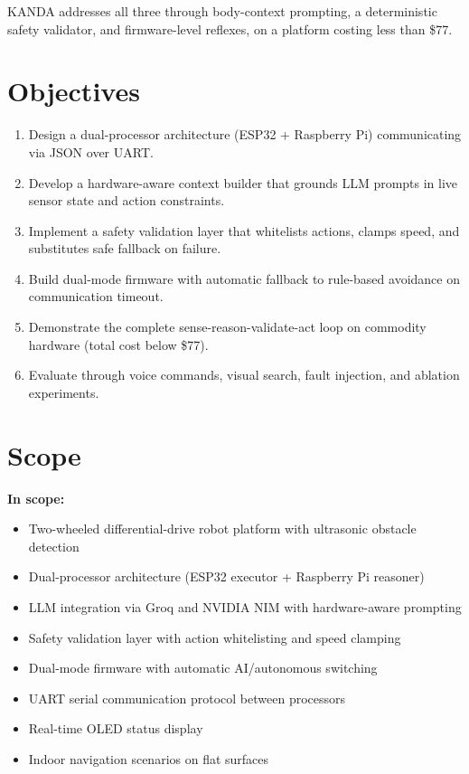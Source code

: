 KANDA addresses all three through body-context prompting, a deterministic safety validator, and firmware-level reflexes, on a platform costing less than \$77.

\section{Objectives}
\label{sec:objectives}

\begin{enumerate}[label=\arabic*.]
  \item Design a dual-processor architecture (ESP32 + Raspberry Pi) communicating via JSON over UART.
  \item Develop a hardware-aware context builder that grounds LLM prompts in live sensor state and action constraints.
  \item Implement a safety validation layer that whitelists actions, clamps speed, and substitutes safe fallback on failure.
  \item Build dual-mode firmware with automatic fallback to rule-based avoidance on communication timeout.
  \item Demonstrate the complete sense-reason-validate-act loop on commodity hardware (total cost below \$77).
  \item Evaluate through voice commands, visual search, fault injection, and ablation experiments.
\end{enumerate}

\section{Scope}
\label{sec:scope}

\textbf{In scope:}
\begin{itemize}[nosep]
  \item Two-wheeled differential-drive robot platform with ultrasonic obstacle detection
  \item Dual-processor architecture (ESP32 executor + Raspberry Pi reasoner)
  \item LLM integration via Groq and NVIDIA NIM with hardware-aware prompting
  \item Safety validation layer with action whitelisting and speed clamping
  \item Dual-mode firmware with automatic AI/autonomous switching
  \item UART serial communication protocol between processors
  \item Real-time OLED status display
  \item Indoor navigation scenarios on flat surfaces
\end{itemize}

